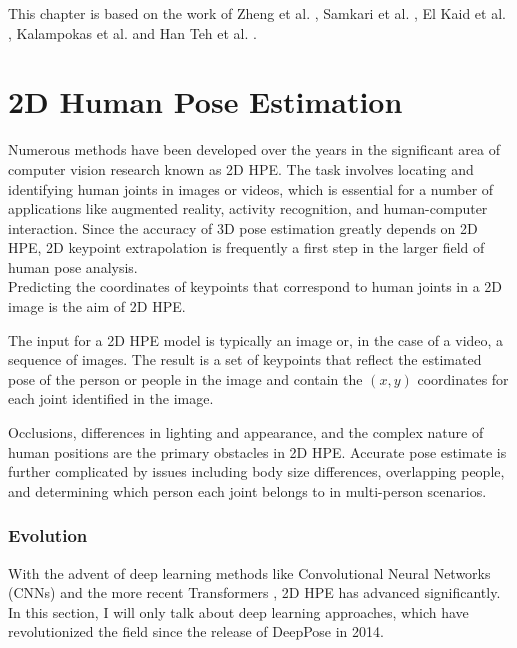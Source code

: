 This chapter is based on the work of Zheng et al. \cite{zheng2023deep}, Samkari et al. \cite{samkari2023human}, El Kaid et al. \cite{el2023systematic}, 
Kalampokas et al. \cite{kalampokas2023performance} and Han Teh et al. \cite{teh2026drone}.
\newpage


\section{2D Human Pose Estimation}
\label{sec:related_work_2d_hpe}
Numerous methods have been developed over the years in the significant area of computer vision research known as 2D HPE.  
The task involves locating and identifying human joints in images or videos, which is essential for a number of applications like augmented reality, activity recognition, and human-computer interaction. 
Since the accuracy of 3D pose estimation greatly depends on 2D HPE, 2D keypoint extrapolation is frequently a first step in the larger field of human pose analysis.\\
Predicting the coordinates of keypoints that correspond to human joints in a 2D image is the aim of 2D HPE. 

The input for a 2D HPE model is typically an image or, in the case of a video, a sequence of images.  The result is a set of keypoints that reflect the estimated pose of the person or people in the image 
and contain the \((x, y)\) coordinates for each joint identified in the image.

Occlusions, differences in lighting and appearance, and the complex nature of human positions are the primary obstacles in 2D HPE.  Accurate pose estimate is further complicated by issues including body 
size differences, overlapping people, and determining which person each joint belongs to in multi-person scenarios.

\subsubsection{Evolution}
With the advent of deep learning methods like Convolutional Neural Networks (CNNs) and the more recent Transformers \cite{vaswani2017attention}, 2D HPE has advanced significantly. In this section, I will only talk about deep learning 
approaches, which have revolutionized the field since the release of DeepPose \cite{toshev2014deeppose} in 2014.

